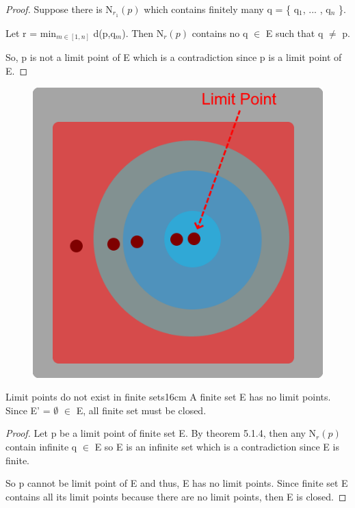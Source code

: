 	\begin{proof}
		Suppose there is N$_{r_1}(p)$ which contains finitely many
		q = \{ q$_1$, ... , q$_n$ \}.

		Let r = min$_{m \in [1,n]}$ d(p,q$_m$). Then N$_r(p)$ contains
		no q $\in$ E such that q $\not =$ p.

		So, p is not a limit point of E which is a contradiction since
		p is a limit point of E.
	\end{proof}



	\begin{figure}[h]
		\centering
		\includegraphics[scale=0.31]{Images/5.1.4.png}
	\end{figure}



	\begin{corollary}{Limit points do not exist in finite sets}{16cm}
		A finite set E has no limit points.
		Since E' = $\emptyset$ $\in$ E, all finite set must be closed.		
	\end{corollary}
	
	\begin{proof}
		Let p be a limit point of finite set E. By {\color{red} theorem 5.1.4}, 
		then any N$_r(p)$ contain infinite q $\in$ E so E is an infinite set
		which is a contradiction since E is finite.

		So p cannot be limit point of E and thus, E has no limit points.
		Since finite set E contains all its limit points because there are no
		limit points, then E is closed.
	\end{proof}

